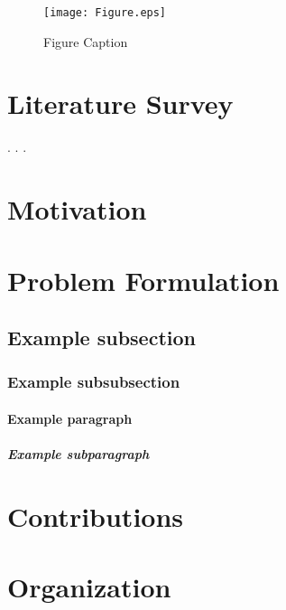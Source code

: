 \begin{figure*}
	\centering
	\texttt{[image: Figure.eps]}
	\caption{Figure Caption}
	\label{a}
\end{figure*}


\section{Literature Survey}\label{LiteratureSurvey}

\lipsum[1] \cite{SimonBook2006}. \lipsum[2]\cite{	Biglieri2006,ProakisBookDC}. \lipsum[3] \cite{PapoulisBook2002}. \lipsum[4]

\section{Motivation}

\lipsum[1-2]

\section{Problem Formulation}

\lipsum[1]
\subsection{Example subsection}
\lipsum[1]
\subsubsection{Example subsubsection}
\lipsum[1]
\paragraph{Example paragraph}
\lipsum[1]
\subparagraph{Example subparagraph}
\lipsum[3]

\section{Contributions}

\lipsum[1]


\section{Organization}

\lipsum[2]
